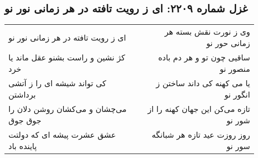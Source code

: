 \begin{center}
\section*{غزل شماره ۲۲۰۹: ای ز رویت تافته در هر زمانی نور نو}
\label{sec:2209}
\begin{longtable}{l p{0.5cm} r}
ای ز رویت تافته در هر زمانی نور نو
&&
وی ز نورت نقش بسته هر زمانی حور نو
\\
کژ نشین و راست بشنو عقل ماند یا خرد
&&
ساقیی چون تو و هر دم باده منصور نو
\\
کی تواند شیشه ای را ز آتشی برداشتن
&&
یا می کهنه کی داند ساختن ز انگور نو
\\
می‌چشان و می‌کشان روشن دلان را جوق جوق
&&
تازه می‌کن این جهان کهنه را از شور نو
\\
عشق عشرت پیشه ای که دولتت پاینده باد
&&
روز روزت عید تازه هر شبانگه سور نو
\\
\end{longtable}
\end{center}
